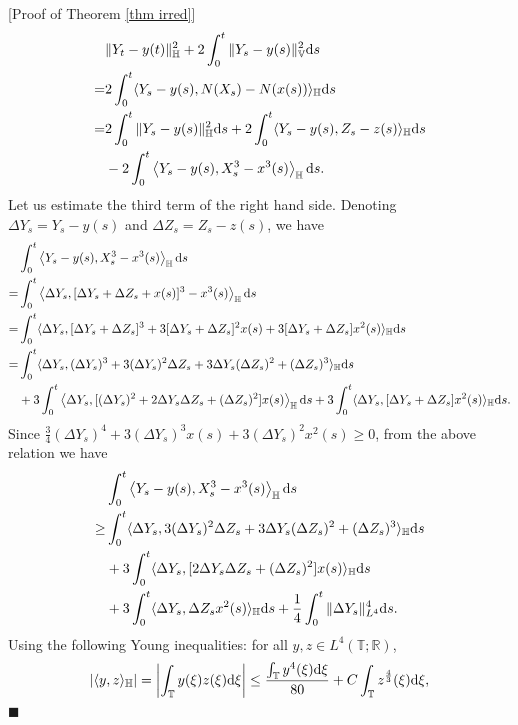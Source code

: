 \documentclass[12pt,a4paper]{article}
\theoremstyle{definition}
\theoremstyle{remark}
\numberwithin{equation}{section}
\newcommand{\T}{\mathbb{T}}
\newcommand{\Ll}{\langle}
\newcommand{\Rr}{\rangle}
\newcommand{\HH}{\mathbb{H}}
\newcommand{\VV}{\mathbb{V}}
\newcommand{\R}{\mathbb{R}}
\newcommand{\dif}{{\rm d}}
\newenvironment{proof}{\par\noindent{\bf Proof:}}{\hspace*{\fill}$\blacksquare$\par}
\begin{document}
{\begin{proof}[Proof of Theorem \ref{thm irred}]
\begin{align*}
 &  \|Y_t-y(t)\|_{\HH}^2 +2\int_{0}^t \|Y_s-y(s)\|^2_{\VV} \dif s \\
=&2 \int_{0}^t \Ll Y_s-y(s), N(X_s)-N(x(s))\Rr_\HH \dif s \\
=& 2\int_{0}^t \|Y_s-y(s)\|^2_\HH \dif s+2 \int_0^t \Ll Y_s-y(s),Z_s-z(s)\Rr_\HH \dif s \\
& -2 \int_{0}^t \left\Ll Y_s-y(s), X^3_s-x^3(s)\right\Rr_\HH \dif s.
 \end{align*}
Let us estimate the third term of the right hand side. Denoting $\Delta Y_s=Y_s-y(s)$ and
$\Delta Z_s=Z_s-z(s)$, we have
\begin{equation*}
\begin{split}
 &\int_{0}^t \left\Ll Y_s-y(s), X^3_s-x^3(s)\right\Rr_\HH \dif s\\
=&  \int_{0}^t \left\Ll \Delta Y_s, [\Delta Y_s+\Delta Z_s+x(s)]^3-x^3(s)\right\Rr_\HH \dif s\\
=&\int_{0}^t \langle \Delta Y_s,[\Delta Y_s+\Delta Z_s]^3+3[\Delta Y_s+\Delta Z_s]^2 x(s)+3[\Delta Y_s+\Delta Z_s] x^2(s) \rangle_\HH \dif s\\
=& \int_{0}^t \langle \Delta Y_s, (\Delta Y_s)^3  +3 (\Delta Y_s)^2 \Delta Z_s +3 \Delta Y_s (\Delta Z_s)^2 +(\Delta Z_s)^3\rangle_\HH \dif s \\
&+3\int_{0}^t \left\langle \Delta Y_s,[(\Delta Y_s)^2+2 \Delta Y_s \Delta Z_s+ (\Delta Z_s)^2] x(s)\right\rangle_\HH\dif s +3\int_{0}^t \langle \Delta Y_s,[\Delta Y_s+\Delta Z_s] x^2(s)\rangle _\HH\dif s.
\end{split}
\end{equation*}
Since $\frac 34  (\Delta Y_s)^4+3 (\Delta Y_s)^3 x(s)+3(\Delta Y_s)^2x^2(s) \ge 0$, from the above relation we have
\begin{align*}
 &\int_{0}^t \left\Ll Y_s-y(s), X^3_s-x^3(s)\right\Rr_\HH \dif s \\
\ge& \int_{0}^t \langle \Delta Y_s,3 (\Delta Y_s)^2 \Delta Z_s+3 \Delta Y_s (\Delta Z_s)^2 +(\Delta Z_s)^3\rangle_\HH \dif s\\
&+3\int_{0}^t \langle \Delta Y_s,[2 \Delta Y_s \Delta Z_s+(\Delta Z_s)^2] x(s) \Rr_\HH \dif s\\
&+3\int_{0}^t \langle \Delta Y_s, \Delta Z_s x^2(s)\rangle_\HH \dif s+\frac14 \int_{0}^t \|\Delta Y_s\|_{L^4}^4\dif s.
\end{align*}
Using the following Young inequalities: for all $y,z\in L^4(\T; \R)$,
\begin{equation}\label{eq Young}
\begin{split}
& |\Ll  y, z \Rr_\HH|=\left|\int_{\mathbb T} y(\xi) z (\xi) \dif \xi\right| \le \frac{\int_{\mathbb T} y^4(\xi) \dif \xi}{80}+ C\int_{\mathbb T} z^{\frac 43}(\xi) \dif \xi, \\

\end{split}
\end{equation}
\end{proof}}
\end{document}
